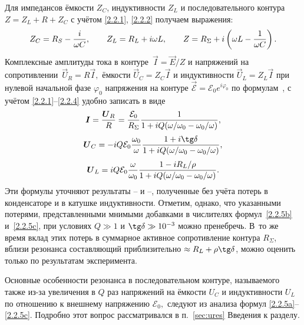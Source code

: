 Для импедансов ёмкости $Z_C$, индуктивности $Z_L$ и последовательного контура
$Z=Z_L+R+Z_C$ с учётом \eqref{2.2.1}, \eqref{2.2.2} получаем выражения:
\begin{equation}\eqmark{2.2.4}
Z_C=R_S-\dfrac{i}{\omega C}, \qquad Z_L=R_L+i\omega L,\qquad
Z=R_{\Sigma}+i\left(\omega L-\dfrac{1}{\omega C}\right).
\end{equation}
Комплексные амплитуды тока в контуре~$\vec I=\vec E/Z$ и напряжений
на сопротивлении~$\vec{U}_{\! R}=R\vec I,$ ёмкости $\vec{U}_{\! C}=Z_C\vec I$ и
индуктивности $\vec{U}_{\! L}=Z_L\vec I$ при нулевой начальной фазе $\varphi_0$
напряжения на контуре $\vec{\mathcal{E}}=\mathcal{E}_0e^{i\varphi_0}$ 
по формулам~,  
с учётом \eqref{2.2.1}--\eqref{2.2.4} удобно записать в виде
		\begin{equation}
			\eqmark{2.2.5a}
			\vec I=\dfrac{\vec
U_R}{R}=\dfrac{\mathcal{E}_0}{R_{\Sigma}}\dfrac{1}{
1+iQ(\omega/\omega_0-\omega_0/\omega)}, \end{equation}
		\begin{equation}
			\eqmark{2.2.5b}
			\vec
U_C=-iQ\mathcal{E}_0\dfrac{\omega_0}{\omega}\dfrac{1+i\tg\delta}{
1+iQ(\omega/\omega_0-\omega_0/\omega)},
		\end{equation}
		\begin{equation}
			\eqmark{2.2.5c}
			\vec
U_L=iQ\mathcal{E}_0\dfrac{\omega}{\omega_0}\dfrac{1-iR_L/\rho}{
1+iQ(\omega/\omega_0-\omega_0/\omega)}.
		\end{equation}
Эти формулы уточняют результаты -- и 
--,
полученные без учёта потерь в конденсаторе и в катушке индуктивности. Отметим,
однако, что указанными потерями, представленными мнимыми добавками в числителях
формул~\eqref{2.2.5b} и~\eqref{2.2.5c}, при условиях $Q\gg1$ и
$\tg \delta \gg 10^{-3}$ можно пренебречь. В~то же время вклад этих потерь в
суммарное активное сопротивление контура $R_{\Sigma}$, вблизи
резонанса составляющий приблизительно $\approx R_L+\rho\tg\delta$, 
можно оценить только по результатам эксперимента.

Основные особенности резонанса в последовательном контуре, называемого также
 из-за увеличения в $Q$ раз напряжений на
ёмкости $U_C$ и индуктивности $U_L$ по отношению к внешнему напряжению
$\mathcal{E}_0,$ следуют из анализа формул \eqref{2.2.5a}--\eqref{2.2.5c}. 
Подробно этот вопрос рассматривался в п.~\ref{sec:ures} Введения к разделу.

